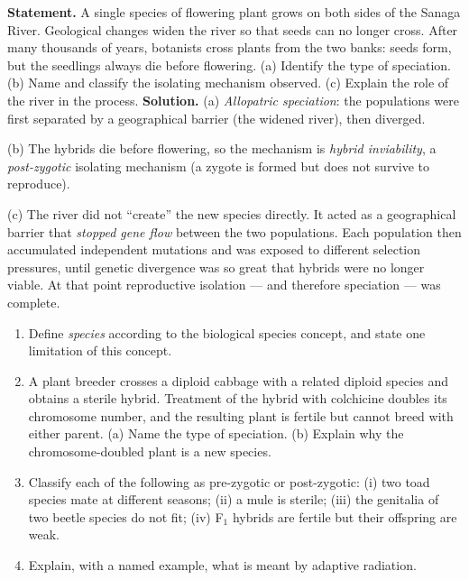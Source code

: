 \documentclass[11pt]{article}
\begin{document}
\begin{exoresolu}
\textbf{Statement.} A single species of flowering plant grows on both sides of the Sanaga River. Geological changes widen the river so that seeds can no longer cross. After many thousands of years, botanists cross plants from the two banks: seeds form, but the seedlings always die before flowering. (a) Identify the type of speciation. (b) Name and classify the isolating mechanism observed. (c) Explain the role of the river in the process.
\tcblower
\textbf{Solution.}
(a) \emph{Allopatric speciation}: the populations were first separated by a geographical barrier (the widened river), then diverged.

(b) The hybrids die before flowering, so the mechanism is \emph{hybrid inviability}, a \emph{post-zygotic} isolating mechanism (a zygote is formed but does not survive to reproduce).

(c) The river did not ``create'' the new species directly. It acted as a geographical barrier that \emph{stopped gene flow} between the two populations. Each population then accumulated independent mutations and was exposed to different selection pressures, until genetic divergence was so great that hybrids were no longer viable. At that point reproductive isolation --- and therefore speciation --- was complete.
\end{exoresolu}

\begin{exercice}
\begin{enumerate}
\item Define \emph{species} according to the biological species concept, and state one limitation of this concept.
\item A plant breeder crosses a diploid cabbage with a related diploid species and obtains a sterile hybrid. Treatment of the hybrid with colchicine doubles its chromosome number, and the resulting plant is fertile but cannot breed with either parent. (a) Name the type of speciation. (b) Explain why the chromosome-doubled plant is a new species.
\item Classify each of the following as pre-zygotic or post-zygotic: (i) two toad species mate at different seasons; (ii) a mule is sterile; (iii) the genitalia of two beetle species do not fit; (iv) F$_1$ hybrids are fertile but their offspring are weak.
\item Explain, with a named example, what is meant by adaptive radiation.
\end{enumerate}
\end{exercice}
\end{document}
